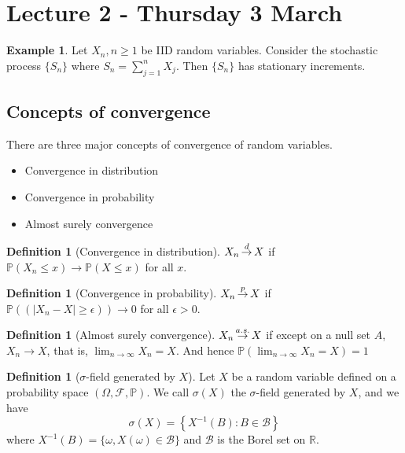 \documentclass[10pt, oneside, reqno]{amsart}
\theoremstyle{plain}%
\theoremstyle{definition}
\newtheorem{defn}[thm]{Definition}
\newtheorem{exmp}[thm]{Example}
\theoremstyle{remark}
\newcommand{\prob}[1]{\mathbb{P}(#1)}
\newcommand{\R}{\mathbb{R}}
\renewcommand{\P}{\mathbb{P}}
\def\cip{\,{\buildrel p \over \rightarrow}\,}
\def\cid{\,{\buildrel d \over \rightarrow}\,}
\def\cas{\,{\buildrel a.s. \over \rightarrow}\,}
\begin{document}
\section{Lecture 2 - Thursday 3 March} %
\label{sec:lecture_2_thursday_3_march}

\begin{exmp}
    Let $X_n, n \geq 1$ be IID random variables.  Consider the stochastic process $\{ S_n \}$ where $S_n = \sum^n_{j=1} X_j$.  Then $\{ S_n \}$ has stationary increments.
\end{exmp}

\subsection{Concepts of convergence} %
\label{sub:convergence_in_distirbution}
There are three major concepts of convergence of random variables.
\begin{itemize}
    \item Convergence in distribution
    \item Convergence in probability
    \item Almost surely convergence
\end{itemize}

\begin{defn}[Convergence in distribution]
    $X_n \cid X$ if $\prob{X_n \leq x} \rightarrow \prob{ X \leq x}$ for all $x$.
\end{defn}

\begin{defn}[Convergence in probability]
    $X_n \cip X$ if $\prob{ (|X_n - X | \geq \epsilon)} \rightarrow 0$ for all $\epsilon > 0$.
\end{defn}

\begin{defn}[Almost surely convergence]
    $X_n \cas X$ if except on a null set $A$, $X_n \rightarrow X$, that is, $\lim_{n \rightarrow \infty} X_n = X$.  And hence $\prob{ \lim_{n \rightarrow \infty} X_n = X} = 1$
\end{defn}


\begin{defn}[$\sigma$-field generated by $X$]
    Let $X$ be a random variable defined on a probability space $(\Omega, \mathcal{F}, \P)$.  We call $\sigma(X)$ the $\sigma$-field generated by $X$, and we have \[
        \sigma(X) = \left\{ X^{-1}(B): B \in \mathcal{B} \right\}
    \] where $X^{-1}(B) = \{ \omega, X(\omega) \in \mathcal{B} \}$ and $\mathcal{B}$ is the Borel set on $\R$.
\end{defn}
\end{document}
